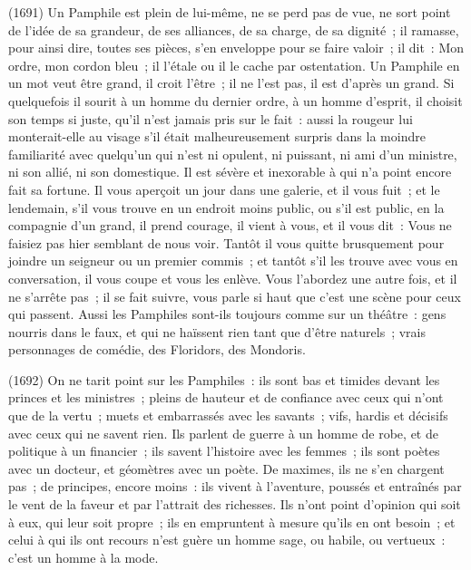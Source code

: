 \documentclass[french,twoside]{book} %
\newcommand{\ed}[1]{ {\color{silver}\sffamily\footnotesize (#1)} } %
\begin{document}
\ed{1691}Un Pamphile est plein de lui-même, ne se perd pas de vue, ne sort point de l’idée de sa grandeur, de ses alliances, de sa charge, de sa dignité ; il ramasse, pour ainsi dire, toutes ses pièces, s’en enveloppe pour se faire valoir ; il dit : Mon ordre, mon cordon bleu ; il l’étale ou il le cache par ostentation. Un Pamphile en un mot veut être grand, il croit l’être ; il ne l’est pas, il est d’après un grand. Si quelquefois il sourit à un homme du dernier ordre, à un homme d’esprit, il choisit son temps si juste, qu’il n’est jamais pris sur le fait : aussi la rougeur lui monterait-elle au visage s’il était malheureusement surpris dans la moindre familiarité avec quelqu’un qui n’est ni opulent, ni puissant, ni ami d’un ministre, ni son allié, ni son domestique. Il est sévère et inexorable à qui n’a point encore fait sa fortune. Il vous aperçoit un jour dans une galerie, et il vous fuit ; et le lendemain, s’il vous trouve en un endroit moins public, ou s’il est public, en la compagnie d’un grand, il prend courage, il vient à vous, et il vous dit : Vous ne faisiez pas hier semblant de nous voir. Tantôt il vous quitte brusquement pour joindre un seigneur ou un premier commis ; et tantôt s’il les trouve avec vous en conversation, il vous coupe et vous les enlève. Vous l’abordez une autre fois, et il ne s’arrête pas ; il se fait suivre, vous parle si haut que c’est une scène pour ceux qui passent. Aussi les Pamphiles sont-ils toujours comme sur un théâtre : gens nourris dans le faux, et qui ne haïssent rien tant que d’être naturels ; vrais personnages de comédie, des Floridors, des Mondoris.\par
\ed{1692}On ne tarit point sur les Pamphiles : ils sont bas et timides devant les princes et les ministres ; pleins de hauteur et de confiance avec ceux qui n’ont que de la vertu ; muets et embarrassés avec les savants ; vifs, hardis et décisifs avec ceux qui ne savent rien. Ils parlent de guerre à un homme de robe, et de politique à un financier ; ils savent l’histoire avec les femmes ; ils sont poètes avec un docteur, et géomètres avec un poète. De maximes, ils ne s’en chargent pas ; de principes, encore moins : ils vivent à l’aventure, poussés et entraînés par le vent de la faveur et par l’attrait des richesses. Ils n’ont point d’opinion qui soit à eux, qui leur soit propre ; ils en empruntent à mesure qu’ils en ont besoin ; et celui à qui ils ont recours n’est guère un homme sage, ou habile, ou vertueux : c’est un homme à la mode.\par
\bigbreak
\end{document}
